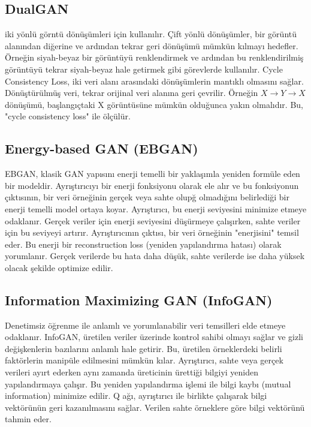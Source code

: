 \subsection{DualGAN}

iki yönlü görntü dönüşümleri için kullanılır. Çift yönlü dönüşümler, bir görüntü alanından diğerine ve ardından tekrar geri dönüşümü mümkün kılmayı hedefler. Örneğin siyah-beyaz bir görüntüyü renklendirmek ve ardından bu renklendirilmiş görüntüyü tekrar siyah-beyaz hale getirmek gibi görevlerde kullanılır. Cycle Consistency Loss, iki veri alanı arasındaki dönüşümlerin mantıklı olmasını sağlar. Dönüştürülmüş veri, tekrar orijinal veri alanına geri çevrilir. Örneğin $X \rightarrow Y \rightarrow X$ dönüşümü, başlangıçtaki X görüntüsüne mümkün olduğunca yakın olmalıdır. Bu, "cycle consistency loss" ile ölçülür.

\subsection{Energy-based GAN (EBGAN)}

EBGAN, klasik GAN yapısını enerji temelli bir yaklaşımla yeniden formüle eden bir modeldir. Ayrıştırıcıyı bir enerji fonksiyonu olarak ele alır ve bu fonksiyonun çıktısının, bir veri örneğinin gerçek veya sahte olupğ olmadığını belirlediği bir enerji temelli model ortaya koyar. Ayrıştırıcı, bu enerji seviyesini minimize etmeye odaklanır. Gerçek veriler için enerji seviyesini düşürmeye çalışırken, sahte veriler için bu seviyeyi artırır. Ayrıştırıcının çıktısı, bir veri örneğinin "enerjisini" temsil eder. Bu enerji bir reconstruction loss (yeniden yapılandırma hatası) olarak yorumlanır. Gerçek verilerde bu hata daha düşük, sahte verilerde ise daha yüksek olacak şekilde optimize edilir.

\subsection{Information Maximizing GAN (InfoGAN)}

Denetimsiz öğrenme ile anlamlı ve yorumlanabilir veri temsilleri elde etmeye odaklanır. InfoGAN, üretilen veriler üzerinde kontrol sahibi olmayı sağlar ve gizli değişkenlerin bazılarını anlamlı hale getirir. Bu, üretilen örneklerdeki belirli faktörlerin manipüle edilmesini mümkün kılar. Ayrıştırıcı, sahte veya gerçek verileri ayırt ederken aynı zamanda üreticinin ürettiği bilgiyi yeniden yapılandırmaya çalışır. Bu yeniden yapılandırma işlemi ile bilgi kaybı (mutual information) minimize edilir. Q ağı, ayrıştırıcı ile birlikte çalışarak bilgi vektörünün geri kazanılmasını sağlar. Verilen sahte örneklere göre bilgi vektörünü tahmin eder. 

